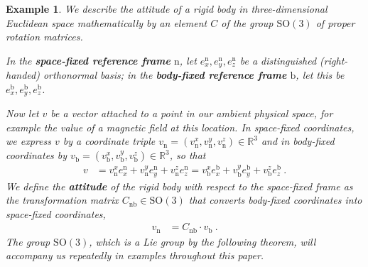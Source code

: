 \documentclass[10pt,a4paper]{article}
\theoremstyle{mytheorem}
\theoremstyle{mydefinition}
\newtheorem{example}[theorem]{Example}
\newcommand{\mydef}[1]{\textbf{\textit{#1}}}
\newcommand{\SO}{\mathrm{SO}}
\newcommand{\body}{\mathrm{b}}
\newcommand{\nav}{\mathrm{n}}
\begin{document}
\begin{example}
\label{ex:attitude}
We describe the attitude of a rigid body in three-dimensional Euclidean space mathematically by an element $C$ of the group $\SO(3)$ of proper rotation matrices.

In the \mydef{space-fixed reference frame} $\nav$, let $e_x^\nav, e_y^\nav, e_z^\nav$ be a distinguished (right-handed) orthonormal basis; in the \mydef{body-fixed reference frame} $\body$, let this be $e_x^\body, e_y^\body, e_z^\body$.

Now let $v$ be a vector attached to a point in our ambient physical space, for example the value of a magnetic field at this location.
In space-fixed coordinates, we express $v$ by a coordinate triple
$v_\nav=(v_\nav^x, v_\nav^y, v_\nav^z)\in\mathbb{R}^3$ and in body-fixed coordinates by $v_\body=(v_\body^x, v_\body^y, v_\body^z)\in\mathbb{R}^3$, so that
\begin{align*}
	v &=
	v_\nav^x e_x^\nav
	+ v_\nav^y e_y^\nav
	+ v_\nav^z e_z^\nav
	=
	v_\body^x e_x^\body
	+ v_\body^y e_y^\body
	+ v_\body^z e_z^\body
	\ .
\end{align*}
We define the \mydef{attitude} of the rigid body with respect to the space-fixed frame as the transformation matrix $C_{\nav\body}\in\SO(3)$ that converts body-fixed coordinates into space-fixed coordinates,
\begin{align*}
	v_\nav &= C_{\nav\body} \cdot v_\body
	\ .
\end{align*}
The group $\SO(3)$, which is a Lie group by the following theorem, will accompany us repeatedly in examples throughout this paper.
\end{example}
\end{document}
